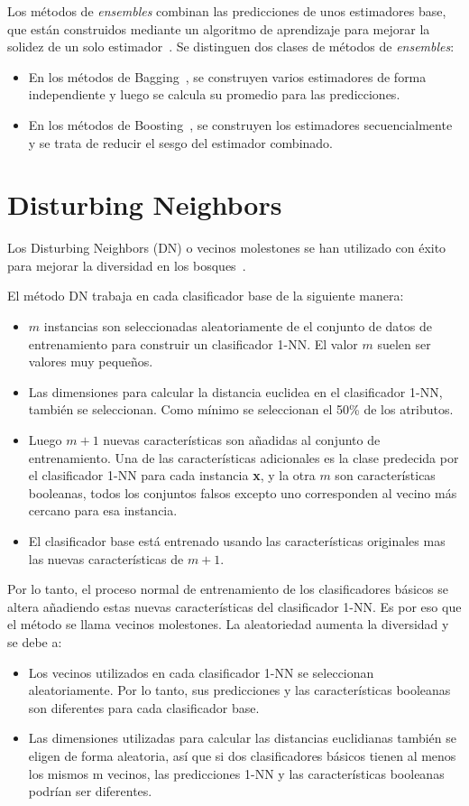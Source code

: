 Los métodos de \textit{ensembles} combinan las predicciones de unos estimadores base, que están construidos mediante un algoritmo de aprendizaje para mejorar la solidez de un solo estimador~\cite{ensemble}.
Se distinguen dos clases de métodos de \textit{ensembles}:
	\begin{itemize}
		\item En los métodos de Bagging~\cite{bagging}, se construyen varios estimadores de forma independiente y luego se calcula su promedio para las predicciones.
		\item En los métodos de Boosting~\cite{boosting}, se construyen los estimadores secuencialmente y se trata de reducir el sesgo del estimador combinado. 
	\end{itemize}

\section{Disturbing Neighbors}

Los Disturbing Neighbors (DN) o vecinos molestones se han utilizado con éxito para mejorar la diversidad en los bosques~\cite{disturbingneighbors}.

El método DN trabaja en cada clasificador base de la siguiente manera:
\begin{itemize}
    \item $m$ instancias son seleccionadas aleatoriamente de el conjunto de datos de entrenamiento para construir un clasificador 1-NN. El valor $m$ suelen ser valores muy pequeños.
    \item Las dimensiones para calcular la distancia euclidea en el clasificador 1-NN, también se seleccionan. Como mínimo se seleccionan el 50\% de los atributos.
    \item Luego $m+1$ nuevas características son añadidas al conjunto de entrenamiento. Una de las características adicionales es la clase predecida por el clasificador 1-NN para cada instancia \textbf{x}, y la otra $m$ son características booleanas, todos los conjuntos falsos excepto uno corresponden al vecino más cercano para esa instancia.
    \item El clasificador base está entrenado usando las características originales mas las nuevas características de $m+1$. 
\end{itemize}
Por lo tanto, el proceso normal de entrenamiento de los clasificadores básicos se altera añadiendo estas nuevas características del clasificador 1-NN. Es por eso que el método se llama vecinos molestones. La aleatoriedad aumenta la diversidad y se debe a:
\begin{itemize}
\item Los vecinos utilizados en cada clasificador 1-NN se seleccionan aleatoriamente. Por lo tanto, sus predicciones y las características booleanas son diferentes para cada clasificador base.
\item Las dimensiones utilizadas para calcular las distancias euclidianas también se eligen de forma aleatoria, así que si dos clasificadores básicos tienen al menos los mismos m vecinos, las predicciones 1-NN y las características booleanas podrían ser diferentes.
\end{itemize}

